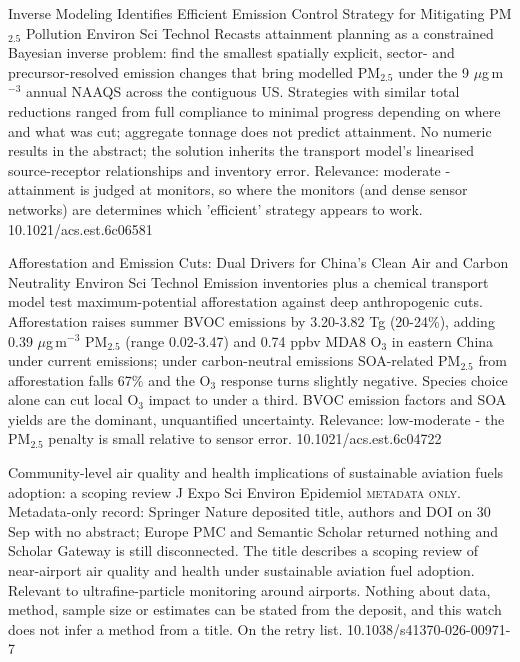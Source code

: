 \documentclass[10pt]{article}
\begin{document}
{Inverse Modeling Identifies Efficient Emission Control Strategy for Mitigating PM$_{2.5}$ Pollution}
{Environ Sci Technol}
{Recasts attainment planning as a constrained Bayesian inverse problem: find the smallest spatially explicit, sector- and precursor-resolved emission changes that bring modelled PM$_{2.5}$ under the 9 $\mu$g\,m$^{-3}$ annual NAAQS across the contiguous US. Strategies with similar total reductions ranged from full compliance to minimal progress depending on where and what was cut; aggregate tonnage does not predict attainment. No numeric results in the abstract; the solution inherits the transport model's linearised source-receptor relationships and inventory error. Relevance: moderate - attainment is judged at monitors, so where the monitors (and dense sensor networks) are determines which 'efficient' strategy appears to work.}
{10.1021/acs.est.6c06581}

{Afforestation and Emission Cuts: Dual Drivers for China's Clean Air and Carbon Neutrality}
{Environ Sci Technol}
{Emission inventories plus a chemical transport model test maximum-potential afforestation against deep anthropogenic cuts. Afforestation raises summer BVOC emissions by 3.20-3.82 Tg (20-24\%), adding 0.39 $\mu$g\,m$^{-3}$ PM$_{2.5}$ (range 0.02-3.47) and 0.74 ppbv MDA8 O$_3$ in eastern China under current emissions; under carbon-neutral emissions SOA-related PM$_{2.5}$ from afforestation falls 67\% and the O$_3$ response turns slightly negative. Species choice alone can cut local O$_3$ impact to under a third. BVOC emission factors and SOA yields are the dominant, unquantified uncertainty. Relevance: low-moderate - the PM$_{2.5}$ penalty is small relative to sensor error.}
{10.1021/acs.est.6c04722}

{Community-level air quality and health implications of sustainable aviation fuels adoption: a scoping review}
{J Expo Sci Environ Epidemiol}
{\textsc{metadata only.} Metadata-only record: Springer Nature deposited title, authors and DOI on 30 Sep with no abstract; Europe PMC and Semantic Scholar returned nothing and Scholar Gateway is still disconnected. The title describes a scoping review of near-airport air quality and health under sustainable aviation fuel adoption. Relevant to ultrafine-particle monitoring around airports. Nothing about data, method, sample size or estimates can be stated from the deposit, and this watch does not infer a method from a title. On the retry list.}
{10.1038/s41370-026-00971-7}
\end{document}
